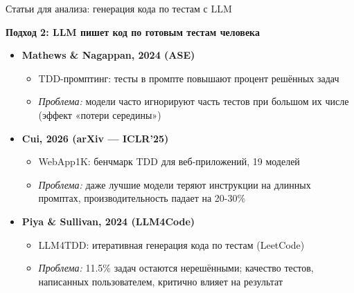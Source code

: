 \begin{frame}{Статьи для анализа: генерация кода по тестам с LLM}

\textbf{Подход 2: LLM пишет код по готовым тестам человека}

\vspace{0.3cm}

\begin{itemize}
    \item \textbf{Mathews \& Nagappan, 2024 (ASE)}
    \begin{itemize}
        \item TDD-промптинг: тесты в промпте повышают процент решённых задач
        \item \textit{Проблема:} модели часто игнорируют часть тестов при большом их числе (эффект «потери середины»)
    \end{itemize}

    \vspace{0.2cm}

    \item \textbf{Cui, 2026 (arXiv — ICLR'25)}
    \begin{itemize}
        \item WebApp1K: бенчмарк TDD для веб-приложений, 19 моделей
        \item \textit{Проблема:} даже лучшие модели теряют инструкции на длинных промптах, производительность падает на 20-30\%
    \end{itemize}

    \vspace{0.2cm}

    \item \textbf{Piya \& Sullivan, 2024 (LLM4Code)}
    \begin{itemize}
        \item LLM4TDD: итеративная генерация кода по тестам (LeetCode)
        \item \textit{Проблема:} 11.5\% задач остаются нерешёнными; качество тестов, написанных пользователем, критично влияет на результат
    \end{itemize}
\end{itemize}

\end{frame}